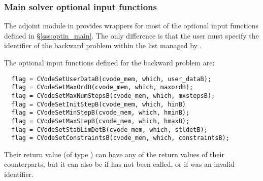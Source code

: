 \subsubsection{Main solver optional input functions}

The adjoint module in {\cvodes} provides wrappers for most of the optional
input functions defined in \S\ref{sss:optin_main}. The only difference is
that the user must specify the identifier  of the backward problem
within the list managed by {\cvodes}.

The optional input functions defined for the backward problem are:
\begin{verbatim}
  flag = CVodeSetUserDataB(cvode_mem, which, user_dataB);
  flag = CVodeSetMaxOrdB(cvode_mem, which, maxordB);
  flag = CVodeSetMaxNumStepsB(cvode_mem, which, mxstepsB);
  flag = CVodeSetInitStepB(cvode_mem, which, hinB)
  flag = CVodeSetMinStepB(cvode_mem, which, hminB);
  flag = CVodeSetMaxStepB(cvode_mem, which, hmaxB);
  flag = CVodeSetStabLimDetB(cvode_mem, which, stldetB);
  flag = CVodeSetConstraintsB(cvode_mem, which, constraintsB);
\end{verbatim}
Their return value  (of type ) can have any of the return values
of their counterparts, but it can also be  if 
has not been called, or  if  was an invalid identifier.



